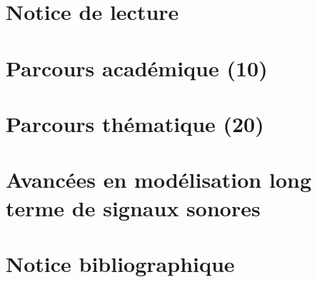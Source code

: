\documentclass[a4paper, french, 10pt]{tufte-book}
\title{}
\author{Mathieu Lagrange}
\begin{document}

\tableofcontents

\chapter{Notice de lecture}

\chapter{Parcours académique (10)}



\chapter{Parcours thématique (20)}



\chapter{Avancées en modélisation long terme de signaux sonores}



\chapter{Notice bibliographique}


\end{document}
